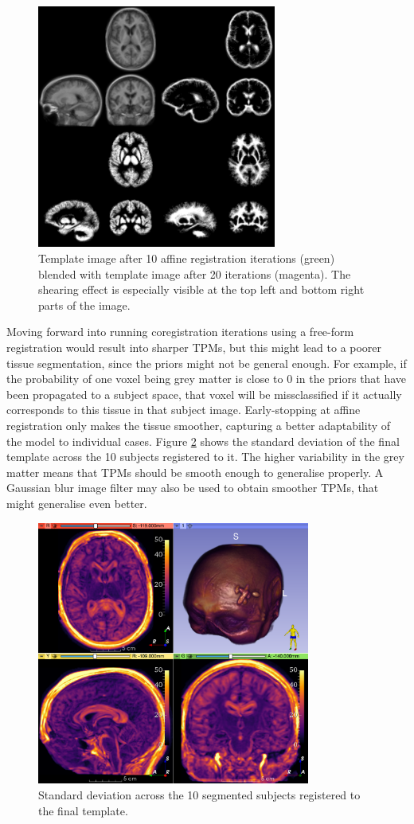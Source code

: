 \begin{figure}
  \centering
  \includegraphics[width=0.7\textwidth]{figures/affine_template_iter_9_collage}
  \centering
  \caption{Template image after 10 affine registration iterations (green) blended with template image after 20 iterations (magenta). The shearing effect is especially visible at the top left and bottom right parts of the image.}
  \label{fig:template-final}
\end{figure}


Moving forward into running coregistration iterations using a free-form registration would result into sharper TPMs, but this might lead to a poorer tissue segmentation, since the priors might not be general enough. For example, if the probability of one voxel being grey matter is close to 0 in the priors that have been propagated to a subject space, that voxel will be missclassified if it actually corresponds to this tissue in that subject image. Early-stopping at affine registration only makes the tissue smoother, capturing a better adaptability of the model to individual cases. Figure \ref{fig:template-std} shows the standard deviation of the final template across the 10 subjects registered to it. The higher variability in the grey matter means that TPMs should be smooth enough to generalise properly. A Gaussian blur image filter may also be used to obtain smoother TPMs, that might generalise even better.

\begin{figure}
  \includegraphics[width=0.8\textwidth]{figures/affine_9_std}
  \centering
  \caption{Standard deviation across the 10 segmented subjects registered to the final template.}
  \label{fig:template-std}
\end{figure}
